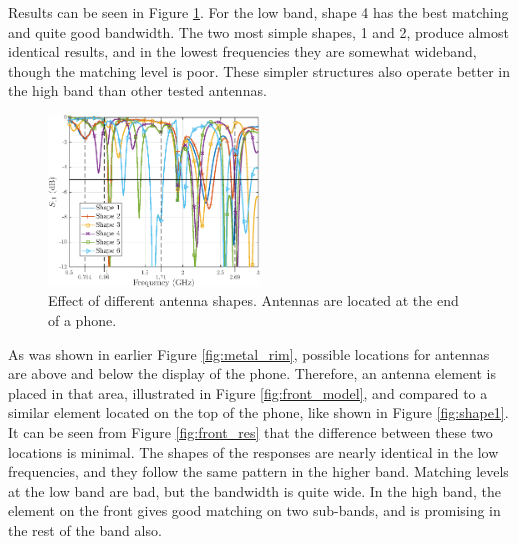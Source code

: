Results can be seen in Figure \ref{fig:shape}. For the low band, shape 4 has the best matching and quite good bandwidth. The two most simple shapes, 1 and 2, produce almost identical results, and in the lowest frequencies they are somewhat wideband, though the matching level is poor. These simpler structures also operate better in the high band than other tested antennas.

\begin{figure}[H]
    \centering
    \includegraphics[width=0.5\textwidth]{img/shape.eps}
    \caption{Effect of different antenna shapes. Antennas are located at the end of a phone.}
    \label{fig:shape}
\end{figure}

As was shown in earlier Figure \ref{fig:metal_rim}, possible locations for antennas are above and below the display of the phone. Therefore, an antenna element is placed in that area, illustrated in Figure \ref{fig:front_model}, and compared to a similar element located on the top of the phone, like shown in Figure \ref{fig:shape1}. It can be seen from Figure \ref{fig:front_res} that the difference between these two locations is minimal. The shapes of the responses are nearly identical in the low frequencies, and they follow the same pattern in the higher band. Matching levels at the low band are bad, but the bandwidth is quite wide. In the high band, the element on the front gives good matching on two sub-bands, and is promising in the rest of the band also.

